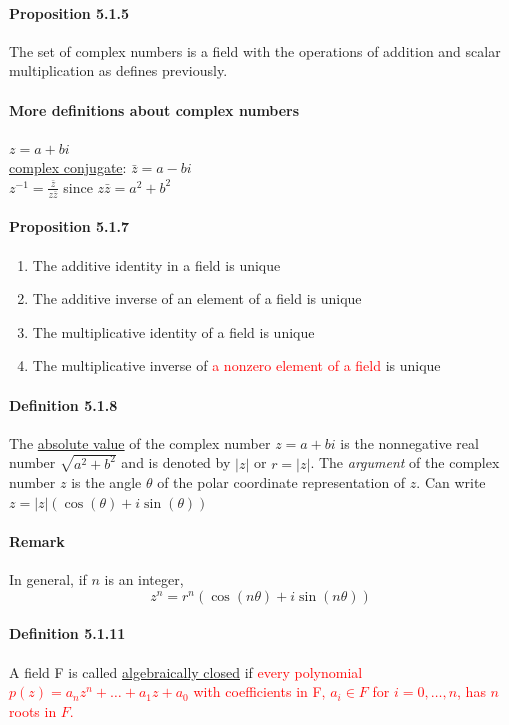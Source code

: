 \documentclass[11pt]{article}
\newcommand{\ti}[1]{\textit{#1}}
\newcommand{\under}[1]{\underline{#1}}
\begin{document}
{\paragraph{Proposition 5.1.5} The set of complex numbers is a field with the operations of addition and scalar multiplication as defines previously.
\paragraph{More definitions about complex numbers}
$z = a + bi$\\
\under{complex conjugate}: $\bar{z} = a - bi$\\
$z^{-1} = \frac{\bar{z}}{z\bar{z}}$ since $z\bar{z} = a^2 + b^2$
\paragraph{Proposition 5.1.7}
\begin{enumerate}
	\item The additive identity in a field is unique
	\item The additive inverse of an element of a field is unique
	\item The multiplicative identity of a field is unique
	\item The multiplicative inverse of \textcolor{red}{a nonzero element of a field} is unique
\end{enumerate}
\paragraph{Definition 5.1.8}
The \under{absolute value} of the complex number $z = a+bi$ is the nonnegative real number $\sqrt{a^2 + b^2}$ and is denoted by $|z|$ or $r = |z|$. The \ti{argument} of the complex number $z$ is the angle $\theta$ of the polar coordinate representation of $z$. Can write $z = |z|(\cos (\theta) + i\sin(\theta))$
\paragraph{Remark}
In general, if $n$ is an integer,
$$z^n = r^n(\cos(n\theta) + i\sin(n\theta))$$ 
\paragraph{Definition 5.1.11}
A field F is called \under{algebraically closed} if \textcolor{red}{every polynomial $p(z) = a_nz^n + \hdots + a_1z + a_0$ with coefficients in F, $a_i \in F$ for $i = 0,\hdots,n$, has $n$ roots in $F$.}

}
\end{document}

